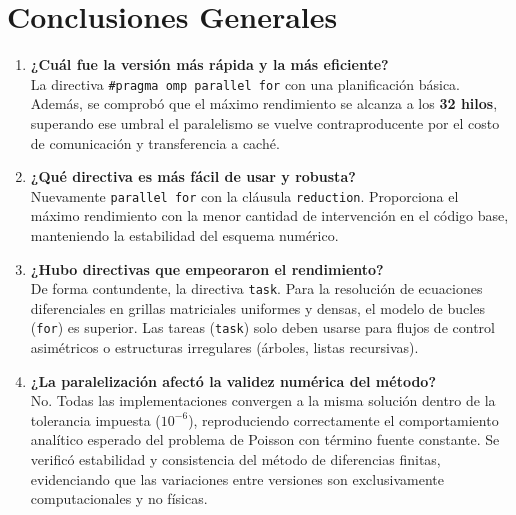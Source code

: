 \documentclass[11pt,a4paper]{article}
\begin{document}
\section*{Conclusiones Generales}
\begin{enumerate}
    \item \textbf{¿Cuál fue la versión más rápida y la más eficiente?} \\
    La directiva \texttt{\#pragma omp parallel for} con una planificación básica. Además, se comprobó que el máximo rendimiento se alcanza a los \textbf{32 hilos}, superando ese umbral el paralelismo se vuelve contraproducente por el costo de comunicación y transferencia a caché.

    \item \textbf{¿Qué directiva es más fácil de usar y robusta?} \\
    Nuevamente \texttt{parallel for} con la cláusula \texttt{reduction}. Proporciona el máximo rendimiento con la menor cantidad de intervención en el código base, manteniendo la estabilidad del esquema numérico.

    \item \textbf{¿Hubo directivas que empeoraron el rendimiento?} \\
    De forma contundente, la directiva \texttt{task}. Para la resolución de ecuaciones diferenciales en grillas matriciales uniformes y densas, el modelo de bucles (\texttt{for}) es superior. Las tareas (\texttt{task}) solo deben usarse para flujos de control asimétricos o estructuras irregulares (árboles, listas recursivas).

    \item \textbf{¿La paralelización afectó la validez numérica del método?} \\
    No. Todas las implementaciones convergen a la misma solución dentro de la tolerancia impuesta ($10^{-6}$), reproduciendo correctamente el comportamiento analítico esperado del problema de Poisson con término fuente constante. Se verificó estabilidad y consistencia del método de diferencias finitas, evidenciando que las variaciones entre versiones son exclusivamente computacionales y no físicas.
\end{enumerate}
\end{document}
